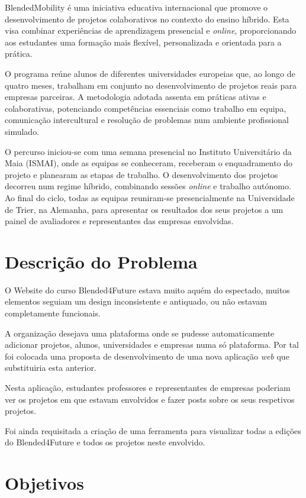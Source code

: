 BlendedMobility é uma iniciativa educativa internacional que promove o desenvolvimento de projetos colaborativos no contexto do ensino híbrido. Esta visa combinar experiências de aprendizagem presencial e \textit{online}, proporcionando aos estudantes uma formação mais flexível, personalizada e orientada para a prática.

O programa reúne alunos de diferentes universidades europeias que, ao longo de quatro meses, trabalham em conjunto no desenvolvimento de projetos reais para empresas parceiras. A metodologia adotada assenta em práticas ativas e colaborativas, potenciando competências essenciais como trabalho em equipa, comunicação intercultural e resolução de problemas num ambiente profissional simulado.

O percurso iniciou-se com uma semana presencial no Instituto Universitário da Maia (ISMAI), onde as equipas se conheceram, receberam o enquadramento do projeto e planearam as etapas de trabalho. O desenvolvimento dos projetos decorreu num regime híbrido, combinando sessões \textit{online} e trabalho autónomo. Ao final do ciclo, todas as equipas reuniram-se presencialmente na Universidade de Trier, na Alemanha, para apresentar os resultados dos seus projetos a um painel de avaliadores e representantes das empresas envolvidas.


\section{Descrição do Problema}
\label{sec:introducao_descproblema}

O Website do curso Blended4Future estava muito aquém do espectado, muitos elementos seguiam um design inconsistente e antiquado, ou não estavam completamente funcionais. 

A organização desejava uma plataforma onde se pudesse automaticamente adicionar projetos, alunos, universidades e empresas numa só plataforma. Por tal foi colocada uma proposta de desenvolvimento de uma nova aplicação \textit{web} que substituiria esta anterior. 

Nesta aplicação, estudantes professores e representantes de empresas poderiam ver os projetos em que estavam envolvidos e fazer posts sobre os seus respetivos projetos.

Foi ainda requisitada a criação de uma ferramenta para visualizar todas a edições do Blended4Future e todos os projetos neste envolvido.

\section{Objetivos}


